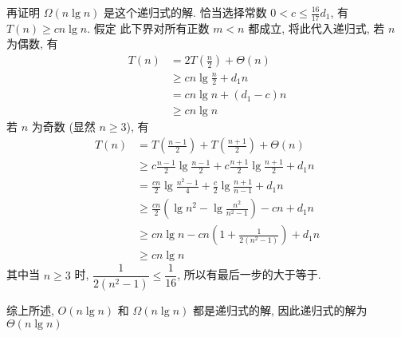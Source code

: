 \documentclass[boxes]{homework}
\begin{document}
\begin{solution}
    再证明 $\Omega(n\lg n)$ 是这个递归式的解. 恰当选择常数
    $0 < c \leqslant \frac{ 16 }{ 17 }d_{1}$, 有 $T(n) \geqslant cn\lg n$. 假定
    此下界对所有正数 $m < n$ 都成立, 将此代入递归式, 若 $n$ 为偶数, 有
    \begin{equation}
        \begin{aligned}
            T(n)
             & = 2T \left( \frac{ n }{ 2 }\right) + \Theta(n) \\
             & \geqslant cn\lg \frac{ n }{ 2 } + d_{1}n       \\
             & = cn\lg n + \left( d_{1} - c\right)n           \\
             & \geqslant cn\lg n
        \end{aligned}
    \end{equation}
    若 $n$ 为奇数 (显然 $n \geqslant 3$), 有
    \begin{equation}
        \begin{aligned}
            T(n)
             & = T \left( \frac{ n - 1 }{ 2 }\right) +
            T \left( \frac{ n + 1 }{ 2 }\right) + \Theta(n)              \\
             & \geqslant c \frac{ n - 1 }{ 2 } \lg \frac{ n - 1 }{ 2 } +
            c \frac{ n + 1 }{ 2 } \lg \frac{ n + 1 }{ 2 } + d_{1} n      \\
             & = \frac{ cn }{ 2 } \lg \frac{ n^{2} - 1 }{ 4 } +
            \frac{ c }{ 2 }\lg \frac{ n + 1 }{ n - 1 } + d_{1}n          \\
             & \geqslant \frac{ cn }{ 2 }
            \left( \lg n^{2} - \lg \frac{ n^{2} }{ n^{2} - 1 } \right) -
            cn + d_{1}n                                                  \\
             & \geqslant cn\lg n -
            cn \left( 1 + \frac{ 1 }{ 2 \left( n^{2} - 1\right) }\right) +
            d_{1}n                                                       \\
             & \geqslant cn\lg n
        \end{aligned}
    \end{equation}
    其中当 $n \geqslant 3$ 时, $\dfrac{ 1 }{ 2 \left( n^{2} - 1\right) }
        \leqslant \dfrac{ 1 }{ 16 }$, 所以有最后一步的大于等于.

    综上所述, $O(n\lg n)$ 和 $\Omega(n\lg n)$ 都是递归式的解, 因此递归式的解为
    $\Theta(n\lg n)$
\end{solution}
\end{document}
